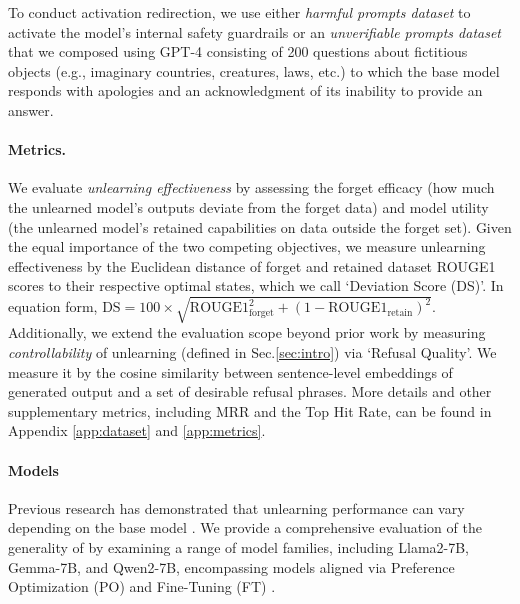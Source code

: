 To conduct activation redirection, we use either \emph{harmful prompts dataset} \citep{arditi2024refusal} to activate the model's internal safety guardrails or an \emph{unverifiable prompts dataset} that we composed using GPT-4 consisting of 200 questions about fictitious objects (e.g., imaginary countries, creatures, laws, etc.) to which the base model responds with apologies and an acknowledgment of its inability to provide an answer. 

\paragraph{Metrics.} We evaluate \emph{unlearning effectiveness} by assessing the forget efficacy (how much the unlearned model's outputs deviate from the forget data) and model utility (the unlearned model's retained capabilities on data outside the forget set). Given the equal importance of the two competing objectives, we measure unlearning effectiveness by the Euclidean distance of forget and retained dataset ROUGE1 scores to their respective optimal states, which we call `Deviation Score (DS)'. In equation form,
$\text{DS} = 100 \times \sqrt{ \text{ROUGE1}_\text{forget}^2 + (1 - \text{ROUGE1}_\text{retain})^2}$.
Additionally, we extend the evaluation scope beyond prior work by measuring \emph{controllability} of unlearning (defined in Sec.\ref{sec:intro}) via `Refusal Quality'. We measure it by the cosine similarity between sentence-level embeddings of generated output and a set of desirable refusal phrases. More details and other supplementary metrics, including MRR and the Top Hit Rate, can be found in Appendix \ref{app:dataset} and \ref{app:metrics}.


\vspace{-2mm}
\paragraph{Models} Previous research has demonstrated that unlearning performance can vary depending on the base model \citep{qiu2024pistol}. We provide a comprehensive evaluation of the generality of \lunar by examining a range of model families, including Llama2-7B, Gemma-7B, and Qwen2-7B, encompassing models aligned via Preference Optimization (PO) and Fine-Tuning (FT) \citep{meade2024universal}.


\vspace{-2mm}

